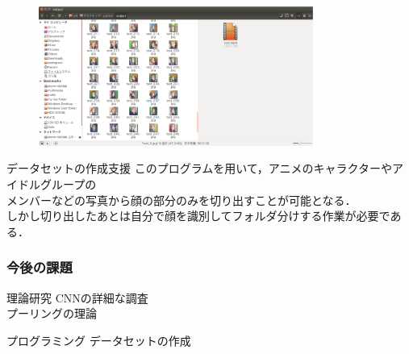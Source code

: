 \documentclass[dvipdfmx,11pt,notheorems]{beamer}
\theoremstyle{definition}
\begin{document}
\begin{frame}[fragile]
\begin{frame}[fragile]
\begin{figure}[t]
  \begin{center}
    \includegraphics[width=9cm]{fig/eps/facedetection_video.eps}
  \end{center}
\end{figure}

\begin{exampleblock}{データセットの作成支援}
このプログラムを用いて，アニメのキャラクターやアイドルグループの\\メンバーなどの写真から顔の部分のみを切り出すことが可能となる．\\
しかし切り出したあとは自分で顔を識別してフォルダ分けする作業が必要である．
\end{exampleblock}
\end{frame}



\begin{frame}\frametitle{今後の課題}

\begin{block}{理論研究}
CNNの詳細な調査\\
プーリングの理論
\end{block}

\vspace{1cm}
\begin{exampleblock}{プログラミング}
データセットの作成
\end{exampleblock}
\end{frame}


\end{frame}
\end{document}
